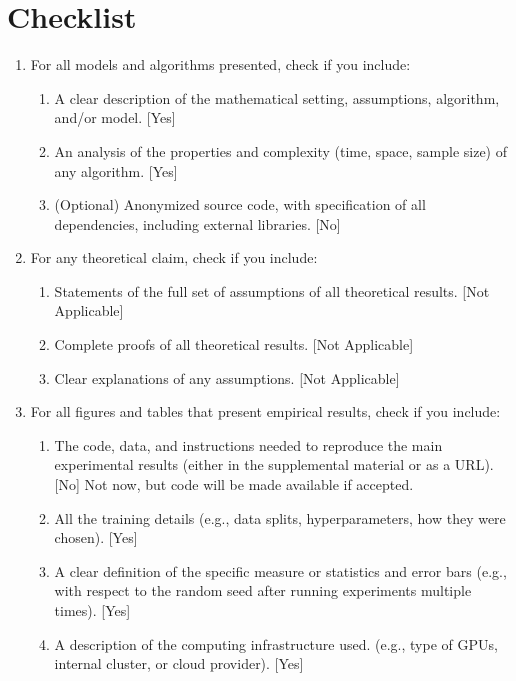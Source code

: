 \documentclass[twoside]{article}
\begin{document}
\clearpage





\section*{Checklist}


 \begin{enumerate}


 \item For all models and algorithms presented, check if you include:
 \begin{enumerate}
   \item A clear description of the mathematical setting, assumptions, algorithm, and/or model. [Yes]
   \item An analysis of the properties and complexity (time, space, sample size) of any algorithm. [Yes]
   \item (Optional) Anonymized source code, with specification of all dependencies, including external libraries. [No]
 \end{enumerate}


 \item For any theoretical claim, check if you include:
 \begin{enumerate}
   \item Statements of the full set of assumptions of all theoretical results. [Not Applicable]
   \item Complete proofs of all theoretical results. [Not Applicable]
   \item Clear explanations of any assumptions. [Not Applicable]   
 \end{enumerate}


 \item For all figures and tables that present empirical results, check if you include:
 \begin{enumerate}
   \item The code, data, and instructions needed to reproduce the main experimental results (either in the supplemental material or as a URL). [No] Not now, but code will be made available if accepted.
   \item All the training details (e.g., data splits, hyperparameters, how they were chosen). [Yes]
         \item A clear definition of the specific measure or statistics and error bars (e.g., with respect to the random seed after running experiments multiple times). [Yes]
         \item A description of the computing infrastructure used. (e.g., type of GPUs, internal cluster, or cloud provider). [Yes]
 \end{enumerate}


\end{enumerate}
\end{document}
